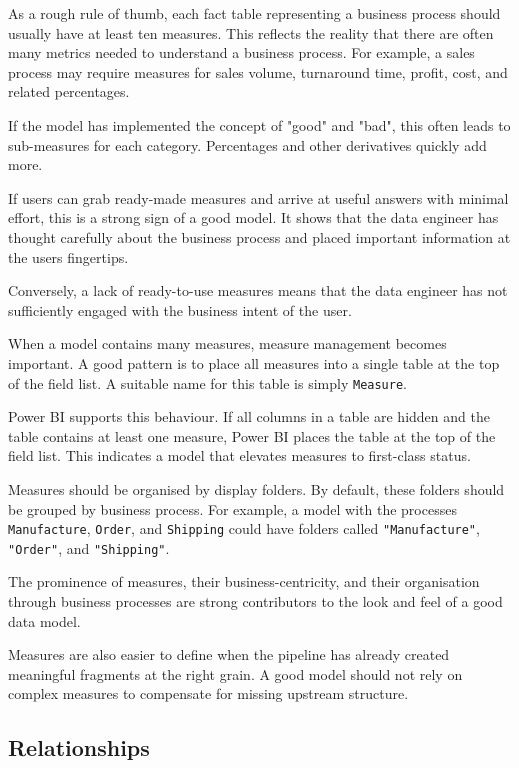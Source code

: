 \documentclass[10pt,openany,10pt]{book}
\begin{document}
As a rough rule of thumb, each fact table representing a business
process should usually have at least ten measures. This reflects the
reality that there are often many metrics needed to understand a
business process. For example, a sales process may require measures for
sales volume, turnaround time, profit, cost, and related percentages.

If the model has implemented the concept of "good" and "bad", this often
leads to sub-measures for each category. Percentages and other
derivatives quickly add more.

If users can grab ready-made measures and arrive at useful answers with
minimal effort, this is a strong sign of a good model. It shows that the
data engineer has thought carefully about the business process and
placed important information at the user\textquotesingle s fingertips.

Conversely, a lack of ready-to-use measures means that the data engineer
has not sufficiently engaged with the business intent of the user.

When a model contains many measures, measure management becomes
important. A good pattern is to place all measures into a single table
at the top of the field list. A suitable name for this table is simply
\texttt{Measure}.

Power BI supports this behaviour. If all columns in a table are hidden
and the table contains at least one measure, Power BI places the table
at the top of the field list. This indicates a model that elevates
measures to first-class status.

Measures should be organised by display folders. By default, these
folders should be grouped by business process. For example, a model with
the processes \texttt{Manufacture}, \texttt{Order}, and
\texttt{Shipping} could have folders called \texttt{"Manufacture"},
\texttt{"Order"}, and \texttt{"Shipping"}.

The prominence of measures, their business-centricity, and their
organisation through business processes are strong contributors to the
look and feel of a good data model.

Measures are also easier to define when the pipeline has already created
meaningful fragments at the right grain. A good model should not rely on
complex measures to compensate for missing upstream structure.

\subsection{Relationships}\label{relationships}
\end{document}
